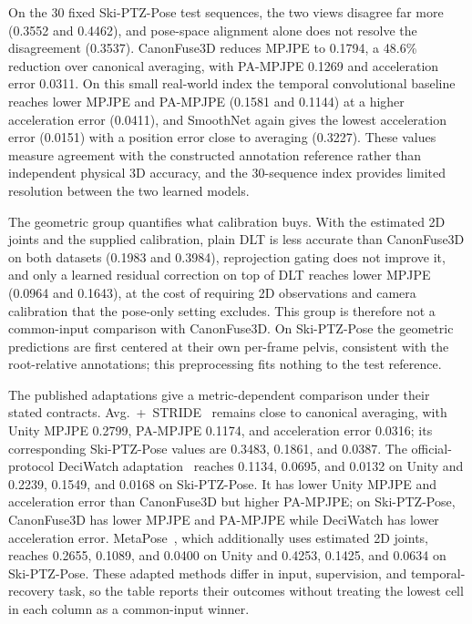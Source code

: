 \documentclass[preprint,12pt]{elsarticle}
\begin{document}
On the 30 fixed Ski-PTZ-Pose test sequences, the two views disagree far more (0.3552 and 0.4462), and pose-space alignment alone does not resolve the disagreement (0.3537). CanonFuse3D reduces MPJPE to 0.1794, a 48.6\% reduction over canonical averaging, with PA-MPJPE 0.1269 and acceleration error 0.0311. On this small real-world index the temporal convolutional baseline reaches lower MPJPE and PA-MPJPE (0.1581 and 0.1144) at a higher acceleration error (0.0411), and SmoothNet again gives the lowest acceleration error (0.0151) with a position error close to averaging (0.3227). These values measure agreement with the constructed annotation reference rather than independent physical 3D accuracy, and the 30-sequence index provides limited resolution between the two learned models.

The geometric group quantifies what calibration buys. With the estimated 2D joints and the supplied calibration, plain DLT is less accurate than CanonFuse3D on both datasets (0.1983 and 0.3984), reprojection gating does not improve it, and only a learned residual correction on top of DLT reaches lower MPJPE (0.0964 and 0.1643), at the cost of requiring 2D observations and camera calibration that the pose-only setting excludes. This group is therefore not a common-input comparison with CanonFuse3D. On Ski-PTZ-Pose the geometric predictions are first centered at their own per-frame pelvis, consistent with the root-relative annotations; this preprocessing fits nothing to the test reference.

The published adaptations give a metric-dependent comparison under their stated contracts. Avg.~+~STRIDE~\cite{lal2025stride} remains close to canonical averaging, with Unity MPJPE 0.2799, PA-MPJPE 0.1174, and acceleration error 0.0316; its corresponding Ski-PTZ-Pose values are 0.3483, 0.1861, and 0.0387. The official-protocol DeciWatch adaptation~\cite{zeng2022deciwatch} reaches 0.1134, 0.0695, and 0.0132 on Unity and 0.2239, 0.1549, and 0.0168 on Ski-PTZ-Pose. It has lower Unity MPJPE and acceleration error than CanonFuse3D but higher PA-MPJPE; on Ski-PTZ-Pose, CanonFuse3D has lower MPJPE and PA-MPJPE while DeciWatch has lower acceleration error. MetaPose~\cite{usman2022metapose}, which additionally uses estimated 2D joints, reaches 0.2655, 0.1089, and 0.0400 on Unity and 0.4253, 0.1425, and 0.0634 on Ski-PTZ-Pose. These adapted methods differ in input, supervision, and temporal-recovery task, so the table reports their outcomes without treating the lowest cell in each column as a common-input winner.
\end{document}
